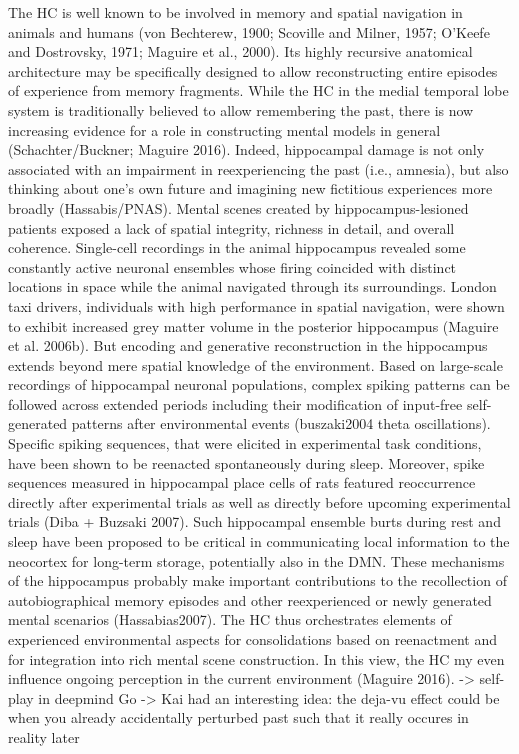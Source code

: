 \documentclass{article} %
\begin{document}
The HC is well known to be involved in memory and
spatial navigation in animals and humans
(von Bechterew, 1900; Scoville and Milner, 1957; O’Keefe and Dostrovsky, 1971; Maguire et al., 2000).
Its highly recursive anatomical architecture
may be specifically designed to allow reconstructing
entire episodes of experience from memory fragments.
%
While the HC in the medial temporal lobe system
is traditionally believed to allow remembering the past,
there is now increasing evidence for a role
in constructing mental models in general (Schachter/Buckner;
Maguire 2016).
Indeed,
hippocampal damage is
not only associated with an impairment in reexperiencing the past (i.e., amnesia),
but also thinking about one’s own future and
imagining new fictitious experiences more broadly (Hassabis/PNAS).
Mental scenes created by hippocampus-lesioned patients exposed a lack of
spatial integrity, richness in detail, and overall coherence.
%
Single-cell recordings in the animal hippocampus revealed
some constantly active neuronal ensembles whose firing coincided with
distinct locations in space while the animal navigated through its surroundings.
London taxi drivers, individuals with high performance in spatial navigation,
were shown to exhibit increased grey matter volume in the
posterior hippocampus (Maguire et al. 2006b).
But encoding and generative reconstruction in the hippocampus extends
beyond mere spatial knowledge of the environment.
Based on large-scale recordings of hippocampal neuronal populations,
complex spiking patterns can be followed across extended periods including
their modification of input-free self-generated patterns
after environmental events (buszaki2004 theta oscillations).
Specific spiking sequences, that were elicited in experimental task conditions,
have been shown to be reenacted spontaneously during sleep.
Moreover, spike sequences measured in hippocampal place cells of rats
featured reoccurrence directly after experimental trials
as well as directly before upcoming experimental trials (Diba + Buzsaki 2007).
Such hippocampal ensemble burts during rest and sleep
have been proposed to be critical in communicating local information
to the neocortex for long-term storage, potentially also in the DMN.
These mechanisms of the hippocampus probably make important contributions to the
recollection of autobiographical memory episodes and other
reexperienced or newly generated mental scenarios (Hassabias2007).
%
The HC thus orchestrates elements of experienced environmental aspects for
consolidations based on reenactment and for integration into 
rich mental scene construction. In this view, the HC my even influence
ongoing perception in the current environment (Maguire 2016).
-> self-play in deepmind Go
-> Kai had an interesting idea: the deja-vu effect could be when you already accidentally perturbed past such that it really occures in reality later
\end{document}
